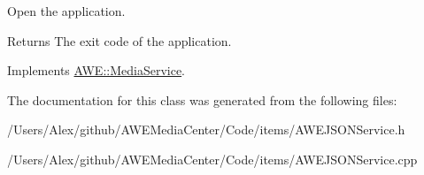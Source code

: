 Open the application. 

\begin{DoxyReturn}{Returns}
The exit code of the application. 
\end{DoxyReturn}


Implements \hyperlink{class_a_w_e_1_1_media_service_ad13c100468482ce42880941bbeca4623}{A\-W\-E\-::\-Media\-Service}.



The documentation for this class was generated from the following files\-:\begin{DoxyCompactItemize}
\item 
/\-Users/\-Alex/github/\-A\-W\-E\-Media\-Center/\-Code/items/A\-W\-E\-J\-S\-O\-N\-Service.\-h\item 
/\-Users/\-Alex/github/\-A\-W\-E\-Media\-Center/\-Code/items/A\-W\-E\-J\-S\-O\-N\-Service.\-cpp\end{DoxyCompactItemize}
